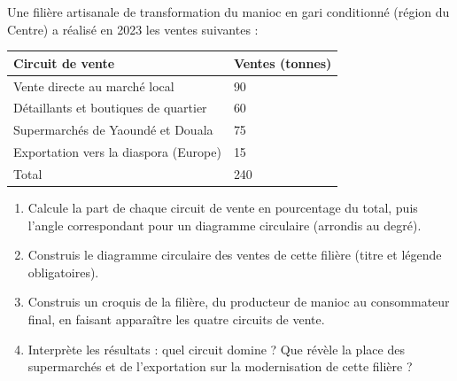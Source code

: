 \documentclass[11pt]{article}
\begin{document}
\begin{exercice}
Une filière artisanale de transformation du manioc en gari conditionné (région du Centre) a réalisé en 2023 les ventes suivantes :

\begin{center}
\begin{tabularx}{\linewidth}{|l|X|}
\hline
\rowcolor{popblueL} Circuit de vente & Ventes (tonnes) \\
\hline
Vente directe au marché local & 90 \\
\hline
Détaillants et boutiques de quartier & 60 \\
\hline
Supermarchés de Yaoundé et Douala & 75 \\
\hline
Exportation vers la diaspora (Europe) & 15 \\
\hline
Total & 240 \\
\hline
\end{tabularx}
\end{center}

\begin{enumerate}
\item Calcule la part de chaque circuit de vente en pourcentage du total, puis l'angle correspondant pour un diagramme circulaire (arrondis au degré).
\item Construis le diagramme circulaire des ventes de cette filière (titre et légende obligatoires).
\item Construis un croquis de la filière, du producteur de manioc au consommateur final, en faisant apparaître les quatre circuits de vente.
\item Interprète les résultats : quel circuit domine ? Que révèle la place des supermarchés et de l'exportation sur la modernisation de cette filière ?
\end{enumerate}
\end{exercice}
\end{document}
